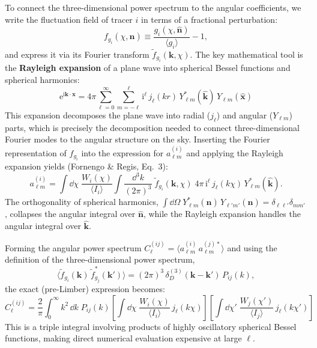 \documentclass[10pt,a4paper]{article}
\newcommand{\Cl}{C_\ell}
\newcommand{\alm}{a_{\ell m}}
\newcommand{\Ylm}{Y_{\ell m}}
\newcommand{\nhat}{\hat{\mathbf{n}}}
\newcommand{\khat}{\hat{\mathbf{k}}}
\newcommand{\xhat}{\hat{\mathbf{x}}}
\newcommand{\vect}[1]{\mathbf{#1}}
\newcommand{\ee}{\mathrm{e}}
\newcommand{\ii}{\mathrm{i}}
\begin{document}
To connect the three-dimensional power spectrum to the angular coefficients, we write the fluctuation field of tracer $i$ in terms of a fractional perturbation:
\begin{equation}
f_{g_i}(\chi, \nhat) \equiv \frac{g_i(\chi, \nhat)}{\langle g_i \rangle} - 1,
\end{equation}
and express it via its Fourier transform $\tilde{f}_{g_i}(\vect{k}, \chi)$. The key mathematical tool is the \textbf{Rayleigh expansion} of a plane wave into spherical Bessel functions and spherical harmonics:
\begin{equation}
\label{eq:rayleigh}
\boxed{
\ee^{\ii \vect{k} \cdot \vect{x}} = 4\pi \sum_{\ell=0}^{\infty} \sum_{m=-\ell}^{\ell} \ii^\ell \, j_\ell(kr) \, \Ylm^*(\khat) \, \Ylm(\xhat)
}
\end{equation}
This expansion decomposes the plane wave into radial ($j_\ell$) and angular ($\Ylm$) parts, which is precisely the decomposition needed to connect three-dimensional Fourier modes to the angular structure on the sky. Inserting the Fourier representation of $f_{g_i}$ into the expression for $\alm^{(i)}$ and applying the Rayleigh expansion yields (Fornengo \& Regis, Eq.~3):
\begin{equation}
\label{eq:alm_fourier}
\alm^{(i)} = \int \dd\chi \; \frac{W_i(\chi)}{\langle I_i \rangle} \int \frac{\dd^3 k}{(2\pi)^3} \; \tilde{f}_{g_i}(\vect{k}, \chi) \; 4\pi \, \ii^\ell \, j_\ell(k\chi) \, \Ylm^*(\khat).
\end{equation}
The orthogonality of spherical harmonics, $\int \dd\Omega \; \Ylm^*(\nhat) \, Y_{\ell' m'}(\nhat) = \delta_{\ell\ell'} \delta_{mm'}$, collapses the angular integral over $\nhat$, while the Rayleigh expansion handles the angular integral over $\khat$.

Forming the angular power spectrum $\Cl^{(ij)} = \langle \alm^{(i)} \, \alm^{(j)*} \rangle$ and using the definition of the three-dimensional power spectrum,
\begin{equation}
\langle \tilde{f}_{g_i}(\vect{k}) \, \tilde{f}_{g_j}^*(\vect{k}') \rangle = (2\pi)^3 \, \delta_D^{(3)}(\vect{k} - \vect{k}') \, P_{ij}(k),
\end{equation}
the exact (pre-Limber) expression becomes:
\begin{equation}
\label{eq:Cl_exact}
\boxed{
\Cl^{(ij)} = \frac{2}{\pi} \int_0^\infty k^2 \, \dd k \; P_{ij}(k) \left[\int \dd\chi \; \frac{W_i(\chi)}{\langle I_i \rangle} \, j_\ell(k\chi)\right] \left[\int \dd\chi' \; \frac{W_j(\chi')}{\langle I_j \rangle} \, j_\ell(k\chi')\right]
}
\end{equation}
This is a triple integral involving products of highly oscillatory spherical Bessel functions, making direct numerical evaluation expensive at large $\ell$.
\end{document}
